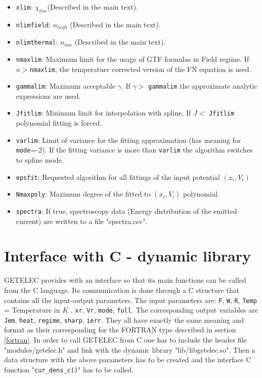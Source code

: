 \documentclass[notitlepage]{revtex4-1}
\begin{document}
\begin{itemize}
	\item \texttt{xlim}:  $\chi_{lim}$(Described in the main text).
	\item \texttt{nlimfield}: $n_{high}$ (Described in the main text).
	\item \texttt{nlimthermal}: $n_{low}$ (Described in the main text).
	\item \texttt{nmaxlim}: Maximum limit for the usage of GTF formulas in Field regime. If $n>$\texttt{nmaxlim}, the temperature corrected version of the FN equation is used.
	\item \texttt{gammalim}: Maximum acceptable $\gamma$. If $\gamma>$ \texttt{gammalim} the approximate analytic expressions are used. 
	\item \texttt{Jfitlim}: Minimum limit for interpolation with spline. If $J<$ \texttt{Jfitlim} polynomial fitting is forced.
	\item \texttt{varlim}: Limit of variance for the fitting approximation (has meaning for \texttt{mode}=-2). If the fitting variance is more than \texttt{varlim} the algorithm switches to spline mode.
	\item \texttt{epsfit}: Requested algorithm for all fittings of the input potential $(x_i, V_i)$
	\item \texttt{Nmaxpoly}: Maximum degree of the fitted to $(x_i, V_i)$ polynomial.
	\item \texttt{spectra}: If true, spectroscopy data (Energy distribution of the emitted current) are written to a file "spectra.csv".   
\end{itemize}

\section{Interface with C - dynamic library}
\label{sec:C}

GETELEC provides with an interface so that its main functions can be called from the C language. Its communication is done through a C structure that contains all the input-output parameters. The input parameters are: \texttt{F}, \texttt{W}, \texttt{R}, \texttt{Temp} = Temperature in $K$ , \texttt{xr}, \texttt{Vr}, \texttt{mode}, \texttt{full}. The corresponding output variables are \texttt{Jem}, \texttt{heat}, \texttt{regime}, \texttt{sharp}, \texttt{ierr}. They all have exactly the same meaning and format as their corresponding for the FORTRAN type described in section \ref{fortran}. In order to call GETELEC from C one has to include the header file "modules/getelec.h" and link with the dynamic library "lib/libgetelec.so". Then a data structure with the above parameters has to be created and the interface C function "\texttt{cur\_dens\_c()}" has to be called. 
\end{document}
